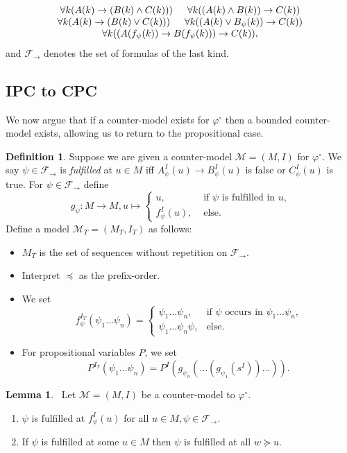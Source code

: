 \documentclass[a4paper,12pt]{report}
\theoremstyle{definition}
\theoremstyle{definition}
\theoremstyle{definition}
\newtheorem{lemma}[theorem]{Lemma}
\theoremstyle{definition}
\theoremstyle{definition}
\newtheorem{definition}[theorem]{Definition}
\theoremstyle{definition}
\theoremstyle{definition}
\begin{document}
	$$\begin{matrix}
		\forall k(A(k)\to (B(k)\wedge C(k)))\indent\forall k((A(k)\wedge B(k))\to C(k))\\
		\forall k(A(k)\to (B(k)\vee C(k)))\indent\forall k((A(k)\vee B_\psi(k))\to C(k))\\
		\forall k((A(f_\psi(k))\to B(f_\psi(k)))\to C(k)),
	\end{matrix}$$
	and $\mathcal F_\to$ denotes the set of formulas of the last kind.

	
	\subsection{IPC to CPC}
	
	We now argue that if a counter-model exists for $\varphi^\circ$ then a bounded counter-model exists, allowing us to return to the propositional case.
	
	\begin{definition}
		Suppose we are given a counter-model $\mathcal M = (M, I)$ for $\varphi^\circ$.
		We say $\psi\in\mathcal F_\to$ is \emph{fulfilled} at $u\in M$ iff $A_\psi^I(u)\to B_\psi^I(u)$ is false or $C_\psi^I(u)$ is true. For $\psi\in\mathcal F_\to$ define $$g_\psi : M\to M, u\mapsto\begin{cases}
			u,&\text{ if $\psi$ is fulfilled in $u$,}\\
			f^I_\psi(u),&\text{ else.}		
		\end{cases}$$Define a model $\mathcal M_T = (M_T, I_T)$ as follows:
		\begin{itemize}
			\item $M_T$ is the set of sequences without repetition on $\mathcal F_\to$.
			\item Interpret $\preceq$ as the prefix-order.
			\item We set $$f_\psi^{I_T}(\psi_1\dots\psi_n) = \begin{cases}
				\psi_1\dots\psi_n, &\text{if $\psi$ occurs in $\psi_1\dots\psi_n$,}\\
				\psi_1\dots\psi_n\psi, &\text{else.}			
			\end{cases}$$
			\item For propositional variables $P$, we set $$P^{I_T}(\psi_1\dots \psi_n) = P^I(g_{\psi_n}(\dots(g_{\psi_1}(s^I))\dots)).$$
		\end{itemize}
	\end{definition}
	\begin{lemma}~\label{thm:prop-countermodel-reduction}
		Let $\mathcal M = (M, I)$ be a counter-model to $\mathcal \varphi^\circ$.
		\begin{enumerate}
			\item $\psi$ is fulfilled at $f_\psi^I(u)$ for all $u\in M, \psi\in\mathcal F_\to$.
			\item If $\psi$ is fulfilled at some $u\in M$ then $\psi$ is fulfilled at all $w\succeq u$.
		\end{enumerate}
	\end{lemma}
	
\end{document}
